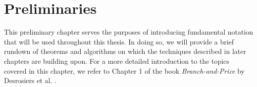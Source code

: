 \chapter{Preliminaries}\label{ch:preliminaries}

This preliminary chapter serves the purposes of introducing fundamental notation that will be used throughout this thesis. In doing so, we will provide a brief rundown of theorems and algorithms on which the techniques described in later chapters are building upon. For a more detailed introduction to the topics covered in this chapter, we refer to Chapter 1 of the book \textit{Branch-and-Price} by Desrosiers et al. \cite{thebook}.



